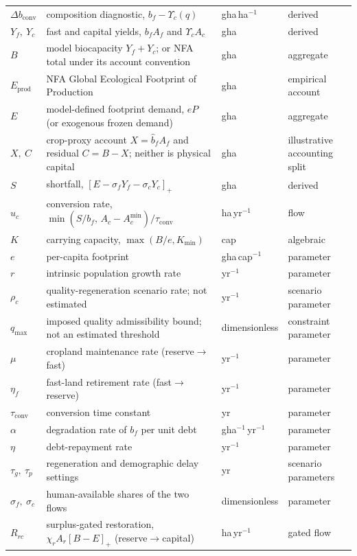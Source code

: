\documentclass[11pt,a4paper]{article}
\newcommand{\pos}[1]{\left[#1\right]_+}
\newcommand{\dconv}{\Delta b_{\mathrm{conv}}}
\newcommand{\Ups}{\Upsilon_c}
\newcommand{\Acmin}{A_c^{\min}}
\newcommand{\tconv}{\tau_{\mathrm{conv}}}
\begin{document}
\begin{longtable}{>{\raggedright\arraybackslash}p{}>{\raggedright\arraybackslash}p{}>{\raggedright\arraybackslash}p{}>{\raggedright\arraybackslash}p{}}
$\dconv$ & composition diagnostic, $b_f-\Ups(q)$ & gha\,ha$^{-1}$ & derived \\
$Y_f,\ Y_c$ & fast and capital yields, $b_fA_f$ and $\Ups A_c$ & gha & derived \\
$B$ & model biocapacity $Y_f+Y_c$; or NFA total under its account convention & gha & aggregate \\
$E_{\mathrm{prod}}$ & NFA Global Ecological Footprint of Production & gha & empirical account \\
$E$ & model-defined footprint demand, $eP$ (or exogenous frozen demand) & gha & aggregate \\
$X,\ C$ & crop-proxy account $X=\hat b_fA_f$ and residual $C=B-X$; neither is physical capital & gha & illustrative accounting split \\
$S$ & shortfall, $\pos{E-\sigma_fY_f-\sigma_cY_c}$ & gha & derived \\
$u_c$ & conversion rate, $\min(S/b_f,\,A_c-\Acmin)/\tconv$ & ha\,yr$^{-1}$ & flow \\
$K$ & carrying capacity, $\max(B/e,K_{\min})$ & cap & algebraic \\
$e$ & per-capita footprint & gha\,cap$^{-1}$ & parameter \\
$r$ & intrinsic population growth rate & yr$^{-1}$ & parameter \\
$\rho_c$ & quality-regeneration scenario rate; not estimated & yr$^{-1}$ & scenario parameter \\
$q_{\max}$ & imposed quality admissibility bound; not an estimated threshold & dimensionless & constraint parameter \\
$\mu$ & cropland maintenance rate (reserve$\to$fast) & yr$^{-1}$ & parameter \\
$\eta_f$ & fast-land retirement rate (fast$\to$reserve) & yr$^{-1}$ & parameter \\
$\tconv$ & conversion time constant & yr & parameter \\
$\alpha$ & degradation rate of $b_f$ per unit debt & gha$^{-1}$\,yr$^{-1}$ & parameter \\
$\eta$ & debt-repayment rate & yr$^{-1}$ & parameter \\
$\tau_g,\ \tau_p$ & regeneration and demographic delay settings & yr & scenario parameters \\
$\sigma_f,\ \sigma_c$ & human-available shares of the two flows & dimensionless & parameter \\
$R_{rc}$ & surplus-gated restoration, $\chi_rA_r\pos{B-E}$ (reserve$\to$capital) & ha\,yr$^{-1}$ & gated flow \\

\end{longtable}
\end{document}
